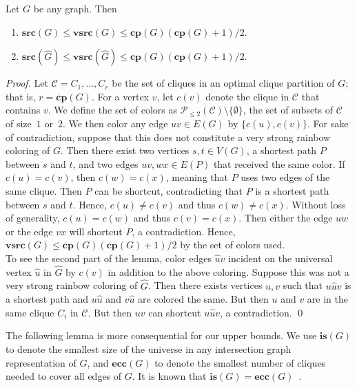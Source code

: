 \documentclass[letter,runningheads,envcountsame,envcountsect]{llncs}
\newcommand{\C}{\mathcal{C}}
\newcommand{\vsrc}{\mathbf{vsrc}}
\newcommand{\src}{\mathbf{src}}
\newcommand{\cp}{\mathbf{cp}}
\newcommand{\isn}{\mathbf{is}}
\newcommand{\ecc}{\mathbf{ecc}}
\begin{document}
\begin{lemma}\label{vsrc-l-cp2}
Let $G$ be any graph. Then 
\begin{enumerate}
\item $\src(G) \leq \vsrc(G) \leq \cp(G)(\cp(G)+1)/2$.
\item $\src(\hat{G}) \leq \vsrc(\hat{G}) \leq \cp(G)(\cp(G)+1)/2$. 
\end{enumerate}
\end{lemma}
\begin{proof}
Let $\C={C_1,\dots,C_r}$ be the set of cliques in an optimal clique partition of $G$; that is, $r = \cp(G)$. For a vertex $v$, let $c(v)$ denote the clique in $\C$ that contains $v$. We define the set of colors as $\mathcal{P}_{\leq 2}(\C) \setminus \{\emptyset\}$, the set of subsets of $\C$ of size~$1$ or~$2$. We then color any edge $uv \in E(G)$ by $\{c(u),c(v)\}$. For sake of contradiction, suppose that this does not constitute a very strong rainbow coloring of $G$. Then there exist two vertices $s,t \in V(G)$, a shortest path $P$ between $s$ and $t$, and two edges $uv, wx \in E(P)$ that received the same color. If $c(u) = c(v)$, then $c(w) = c(x)$, meaning that $P$ uses two edges of the same clique. Then $P$ can be shortcut, contradicting that $P$ is a shortest path between $s$ and $t$. Hence, $c(u) \not= c(v)$ and thus $c(w) \not= c(x)$. Without loss of generality, $c(u) = c(w)$ and thus $c(v) = c(x)$. Then either the edge $uw$ or the edge $vx$ will shortcut $P$, a contradiction. Hence, $\vsrc(G) \leq \cp(G)(\cp(G)+1)/2$ by the set of colors used.\\
To see the second part of the lemma, color edges $\hat{u}v$ incident on the universal vertex $\hat{u}$ in $\hat{G}$ by $c(v)$ in addition to the above coloring. Suppose this was not a very strong rainbow coloring of $\hat{G}$. Then there exists vertices $u,v$ such that $u\hat{u}v$ is a shortest path and $u\hat{u}$ and $v\hat{u}$ are colored the same. But then $u$ and $v$ are in the same clique $C_i$ in $\C$. But then $uv$ can shortcut $u\hat{u}v$, a contradiction.
\qed\end{proof}
%
The following lemma is more consequential for our upper bounds. We use $\isn(G)$ to denote the smallest size of the universe in any intersection graph representation of $G$, and $\ecc(G)$ to denote the smallest number of cliques needed to cover all edges of $G$. It is known that $\isn(G) = \ecc(G)$~\cite{roberts1985applications}.
\end{document}
